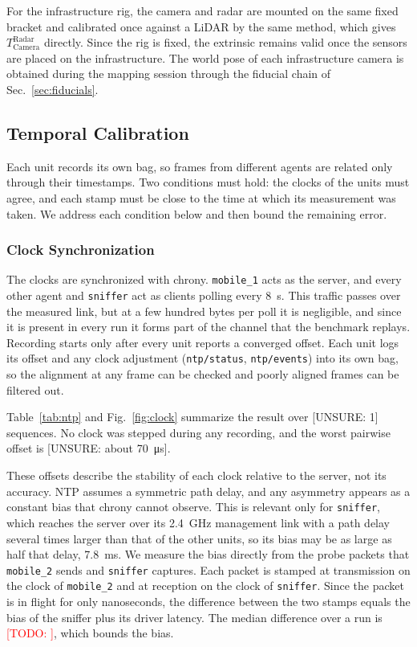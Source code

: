 \documentclass[conference]{IEEEtran}
\newcommand{\todo}[1]{\textcolor{red}{[TODO: #1]}}
\newcommand{\unsure}[1]{\textcolor{darkyellow}{[UNSURE: #1]}}
\newcommand{\Ttransform}[2]{\ensuremath{T_{\mathrm{#1}}^{\mathrm{#2}}}}
\begin{document}
For the infrastructure rig, the camera and radar are mounted on the
same fixed bracket and calibrated once against a LiDAR by the same
method, which gives \Ttransform{Camera}{Radar} directly. Since the
rig is fixed, the extrinsic remains valid once the sensors are placed
on the infrastructure. The world pose of each infrastructure camera
is obtained during the mapping session through the fiducial chain of
Sec.~\ref{sec:fiducials}.



\subsection{Temporal Calibration}
\label{sec:temporal}
Each unit records its own bag, so frames from different agents are
related only through their timestamps. Two conditions must hold: the
clocks of the units must agree, and each stamp must be close to the
time at which its measurement was taken. We address each condition
below and then bound the remaining error.

\subsubsection{Clock Synchronization}
The clocks are synchronized with chrony. \texttt{mobile\_1} acts as
the server, and every other agent and \texttt{sniffer} act as clients
polling every \SI{8}{\second}. This traffic passes over the measured
link, but at a few hundred bytes per poll it is negligible, and since
it is present in every run it forms part of the channel that the
benchmark replays. Recording starts only after every unit reports a
converged offset. Each unit logs its offset and any clock adjustment
(\texttt{ntp/status}, \texttt{ntp/events}) into its own bag, so the
alignment at any frame can be checked and poorly aligned frames can
be filtered out.

Table~\ref{tab:ntp} and Fig.~\ref{fig:clock} summarize the result
over \unsure{1} sequences. No clock was stepped during any recording,
and the worst pairwise offset is \unsure{about
\SI{70}{\micro\second}}.





These offsets describe the stability of each clock relative to the
server, not its accuracy. NTP assumes a symmetric path delay, and any
asymmetry appears as a constant bias that chrony cannot observe. This
is relevant only for \texttt{sniffer}, which reaches the server over
its \SI{2.4}{\giga\hertz} management link with a path delay several
times larger than that of the other units, so its bias may be as
large as half that delay, \SI{7.8}{\milli\second}. We measure the
bias directly from the probe packets that \texttt{mobile\_2} sends
and \texttt{sniffer} captures. Each packet is stamped at transmission
on the clock of \texttt{mobile\_2} and at reception on the clock of
\texttt{sniffer}. Since the packet is in flight for only nanoseconds,
the difference between the two stamps equals the bias of the sniffer
plus its driver latency. The median difference over a run is
\todo{}, which bounds the bias.
\end{document}
